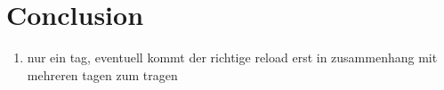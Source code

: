 \chapter{Conclusion}

\begin{enumerate}
	\item nur ein tag, eventuell kommt der richtige reload erst in zusammenhang mit mehreren tagen zum tragen
\end{enumerate}
